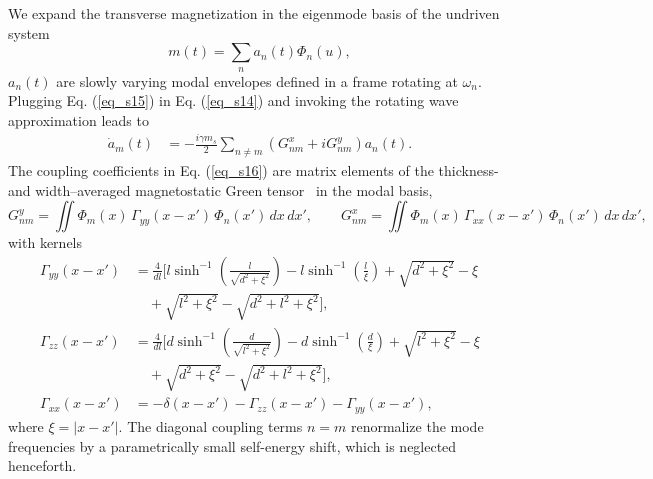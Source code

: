\documentclass[
twocolumn,

superscriptaddress,









 amsmath,amssymb,
 aps,


prl,




]{revtex4-2}
\begin{document}
We expand the transverse magnetization in the eigenmode basis of the undriven system
\begin{equation}
{m}(t) = \sum_n a_n(t) \Phi_n(u),\label{eq_s15}
\end{equation}
\(a_n(t)\) are slowly varying modal envelopes defined in a frame rotating at \(\omega_n\).  Plugging Eq. (\ref{eq_s15}) in Eq. (\ref{eq_s14}) and invoking the rotating wave approximation leads to
\begin{align}
\dot{a}_m(t) &= - \frac{i \gamma m_s}{2} \sum_{n \neq m} \left( G^x_{nm} + i G^y_{nm} \right)a_n(t). \label{eq_s16}
\end{align}
The coupling coefficients in Eq. (\ref{eq_s16}) are matrix elements of the  thickness- and width–averaged magnetostatic Green tensor~\cite{guslienko2011magnetostatic} in the modal basis,
\begin{equation}
G_{n m}^y = \iint \Phi_m(x)\,\Gamma_{yy}(x-x')\,\Phi_{n}(x')\,dx\,dx',
\qquad
G_{n m}^x = \iint \Phi_m(x)\,\Gamma_{xx}(x-x')\,\Phi_{n}(x')\,dx\,dx',
\label{eq_s17}
\end{equation}
with kernels
\begin{equation}
\begin{aligned}
\Gamma_{yy}(x-x') &= \frac{4}{dl}\Bigg[
l\sinh^{-1}\!\left(\frac{l}{\sqrt{d^2+\xi^2}}\right)
- l\sinh^{-1}\!\left(\frac{l}{\xi}\right)
+ \sqrt{d^2+\xi^2}-\xi \\[3pt]
&\quad
+ \sqrt{l^2+\xi^2}-\sqrt{d^2+l^2+\xi^2}
\Bigg], \\[6pt]
\Gamma_{zz}(x-x') &= \frac{4}{dl}\Bigg[
d\sinh^{-1}\!\left(\frac{d}{\sqrt{l^2+\xi^2}}\right)
- d\sinh^{-1}\!\left(\frac{d}{\xi}\right)
+ \sqrt{l^2+\xi^2}-\xi \\[3pt]
&\quad
+ \sqrt{d^2+\xi^2}-\sqrt{d^2+l^2+\xi^2}
\Bigg], \\[6pt]
\Gamma_{xx}(x-x') &= - \delta(x-x') - \Gamma_{zz}(x-x') - \Gamma_{yy}(x-x'),
\end{aligned}
\label{eq_s18}
\end{equation}
where $\xi=|x-x'|$. The diagonal coupling terms \(n=m\) renormalize the mode frequencies by a parametrically small self-energy shift, which is neglected henceforth.
\end{document}
